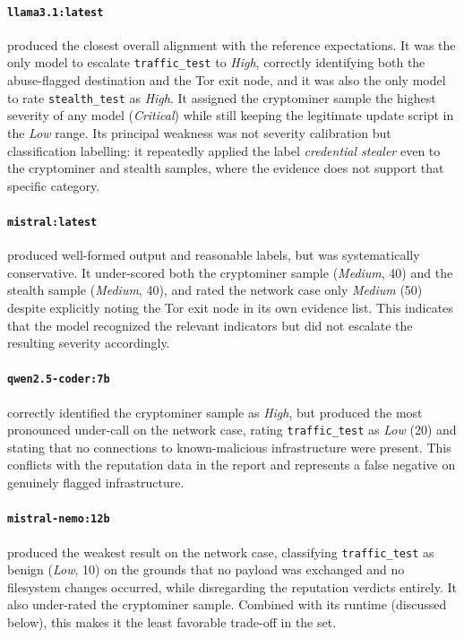 \noindent
\paragraph{\texttt{llama3.1:latest}} produced the closest overall alignment with the reference
expectations. It was the only model to escalate \texttt{traffic\_test} to
\textit{High}, correctly identifying both the abuse-flagged destination and the
Tor exit node, and it was also the only model to rate \texttt{stealth\_test} as
\textit{High}. It assigned the cryptominer sample the highest severity of any
model (\textit{Critical}) while still keeping the legitimate update script in the
\textit{Low} range. Its principal weakness was not severity calibration but
classification labelling: it repeatedly applied the label
\textit{credential stealer} even to the cryptominer and stealth samples, where the
evidence does not support that specific category.

\noindent
\paragraph{\texttt{mistral:latest}}
produced well-formed output and reasonable labels, but was
systematically conservative. It under-scored both the cryptominer sample
(\textit{Medium}, 40) and the stealth sample (\textit{Medium}, 40), and rated the
network case only \textit{Medium} (50) despite explicitly noting the Tor exit node
in its own evidence list. This indicates that the model recognized the relevant
indicators but did not escalate the resulting severity accordingly.

\noindent
\paragraph{\texttt{qwen2.5-coder:7b} }correctly identified the cryptominer sample as
\textit{High}, but produced the most pronounced under-call on the network case,
rating \texttt{traffic\_test} as \textit{Low} (20) and stating that no connections
to known-malicious infrastructure were present. This conflicts with the reputation
data in the report and represents a false negative on genuinely flagged
infrastructure.

\noindent
\paragraph{\texttt{mistral-nemo:12b}} produced the weakest result on the network case,
classifying \texttt{traffic\_test} as benign (\textit{Low}, 10) on the grounds
that no payload was exchanged and no filesystem changes occurred, while
disregarding the reputation verdicts entirely. It also under-rated the cryptominer
sample. Combined with its runtime (discussed below), this makes it the least
favorable trade-off in the set.

